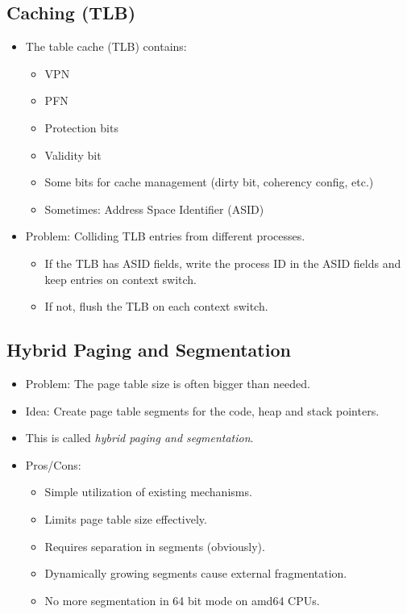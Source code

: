 \documentclass[a4paper, 11pt, accentcolor = tud3b]{tudreport}
\providecommand{\pro}{\item[+]}
\providecommand{\con}{\item[- ]}
\begin{document}
            \subsection{Caching (TLB)} %
	            \label{sec:cachingpaging}
            
            
                \begin{itemize}
                	\item The table cache (TLB) contains:
	                	\begin{itemize}
	                		\item VPN
	                		\item PFN
	                		\item Protection bits
	                		\item Validity bit
	                		\item Some bits for cache management (dirty bit, coherency config, etc.)
	                		\item Sometimes: Address Space Identifier (ASID)
	                	\end{itemize}
                	\item Problem: Colliding TLB entries from different processes.
	                	\begin{itemize}
	                		\item If the TLB has ASID fields, write the process ID in the ASID fields and keep entries on context switch.
	                		\item If not, flush the TLB on each context switch.
	                	\end{itemize}
                \end{itemize}
        
	        \subsection{Hybrid Paging and Segmentation}
		        \label{sec:hybridpaging}
	        
		        \begin{itemize}
		        	\item Problem: The page table size is often bigger than needed.
		        	\item Idea: Create page table segments for the code, heap and stack pointers.
		        	\item This is called \textit{hybrid paging and segmentation}.
		        	\item Pros/Cons:
			        	\begin{itemize}
			        		\pro Simple utilization of existing mechanisms.
			        		\pro Limits page table size effectively.
			        		\con Requires separation in segments (obviously).
			        		\con Dynamically growing segments cause external fragmentation.
			        		\con No more segmentation in 64 bit mode on amd64 CPUs.
			        	\end{itemize}
		        \end{itemize}
	
\end{document}
